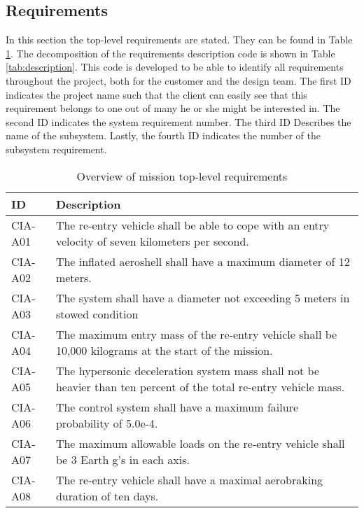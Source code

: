\subsection{Requirements} \label{subsec:systemrequirements}
In this section the top-level requirements are stated. They can be found in Table \ref{tab:requirements}. The decomposition of the requirements description code is shown in Table \ref{tab:description}. This code is developed to be able to identify all requirements throughout the project, both for the customer and the design team. The first ID indicates the project name such that the client can easily see that this requirement belongs to one out of many he or she might be interested in. The second ID indicates the system requirement number. The third ID Describes the name of the subsystem. Lastly, the fourth ID indicates the number of the subsystem requirement.
\vspace{-4mm}
\begin{table}[H]
	\caption{Overview of mission top-level requirements}
	\begin{tabular}{|p{}|p{}|}
    \hline
    ID          & Description                                                                                                      \\ \hline \hline
    CIA-A01 & The re-entry vehicle shall be able to cope with an entry velocity of seven kilometers per second.                \\ \hline
    CIA-A02 & The inflated aeroshell shall have a maximum diameter of 12 meters.                                               \\ \hline
    CIA-A03 & The system shall have a diameter not exceeding 5 meters in stowed condition                                                          \\ \hline
    CIA-A04 & The maximum entry mass of the re-entry vehicle shall be 10,000 kilograms at the start of the mission.	\\ \hline
    CIA-A05 & The hypersonic deceleration system mass shall not be heavier than ten percent of the total re-entry vehicle mass. \\ \hline
    CIA-A06 & The control system shall have a maximum failure probability of 5.0e-4.                                           \\ \hline
    CIA-A07 & The maximum allowable loads on the re-entry vehicle shall be 3 Earth g's in each axis.                            \\ \hline
    CIA-A08 & The re-entry vehicle shall have a maximal aerobraking duration of ten days.                                      \\ \hline
    \end{tabular}
    \label{tab:requirements}
\end{table}

